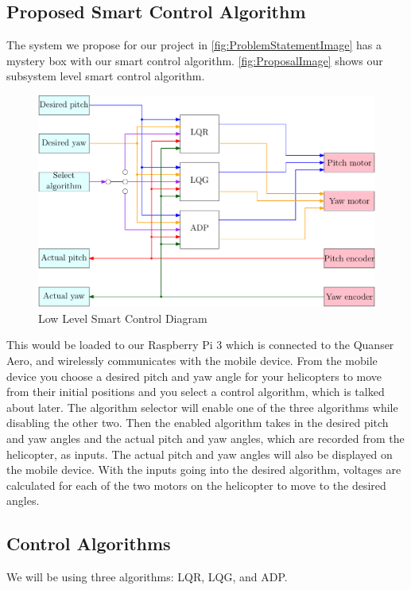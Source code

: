 \documentclass[letterpaper, 10pt, conference]{ieeeconf}
\begin{document}
\subsection{Proposed Smart Control Algorithm}
The system we propose for our project in \autoref{fig:ProblemStatementImage} has a mystery box with our smart control algorithm.  \autoref{fig:ProposalImage} shows our subsystem level smart control algorithm.  
\begin{figure}
  \centering
  \begin{mdframed}[backgroundcolor=yellow!20, roundcorner=7pt,outerlinewidth=1.2pt,outerlinecolor=blue!50]
  \includegraphics[scale=0.335]{figs/ipe/ProposalImage}
  \end{mdframed}
  \caption{Low Level Smart Control Diagram}
  \label{fig:ProposalImage}
\end{figure}
%
This would be loaded to our Raspberry Pi 3 which is connected to the Quanser Aero, and wirelessly communicates with the mobile device.  From the mobile device you choose a desired pitch and yaw angle for your helicopters to move from their initial positions and you select a control algorithm, which is talked about later.  The algorithm selector will enable one of the three algorithms while disabling the other two.  Then the enabled algorithm takes in the desired pitch and yaw angles and the actual pitch and yaw angles, which are recorded from the helicopter, as inputs.  The actual pitch and yaw angles will also be displayed on the mobile device.  With the inputs going into the desired algorithm, voltages are calculated for each of the two motors on the helicopter to move to the desired angles. 

\subsection{Control Algorithms} %
We will be using three algorithms: LQR, LQG, and ADP.
\end{document}

